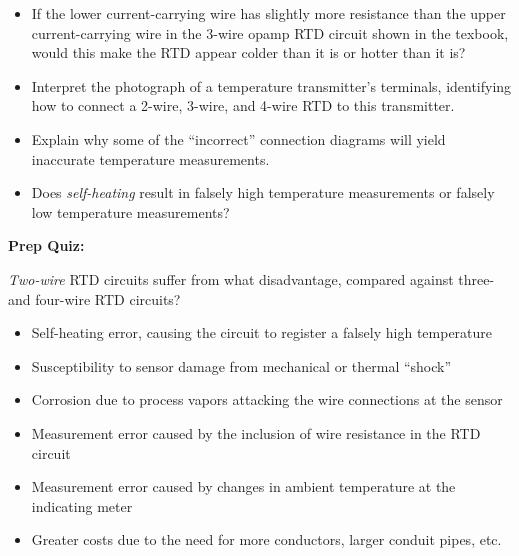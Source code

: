 \begin{itemize}
\item{} If the lower current-carrying wire has slightly more resistance than the upper current-carrying wire in the 3-wire opamp RTD circuit shown in the texbook, would this make the RTD appear colder than it is or hotter than it is?
\item{} Interpret the photograph of a temperature transmitter's terminals, identifying how to connect a 2-wire, 3-wire, and 4-wire RTD to this transmitter.
\item{} Explain why some of the ``incorrect'' connection diagrams will yield inaccurate temperature measurements.
\item{} Does {\it self-heating} result in falsely high temperature measurements or falsely low temperature measurements?
\end{itemize}














\vfil \eject

\noindent
{\bf Prep Quiz:}

{\it Two-wire} RTD circuits suffer from what disadvantage, compared against three- and four-wire RTD circuits?

\begin{itemize}
\item{} Self-heating error, causing the circuit to register a falsely high temperature
\vskip 5pt 
\item{} Susceptibility to sensor damage from mechanical or thermal ``shock'' 
\vskip 5pt 
\item{} Corrosion due to process vapors attacking the wire connections at the sensor
\vskip 5pt 
\item{} Measurement error caused by the inclusion of wire resistance in the RTD circuit
\vskip 5pt 
\item{} Measurement error caused by changes in ambient temperature at the indicating meter
\vskip 5pt 
\item{} Greater costs due to the need for more conductors, larger conduit pipes, etc.
\end{itemize}












\vfil \eject

